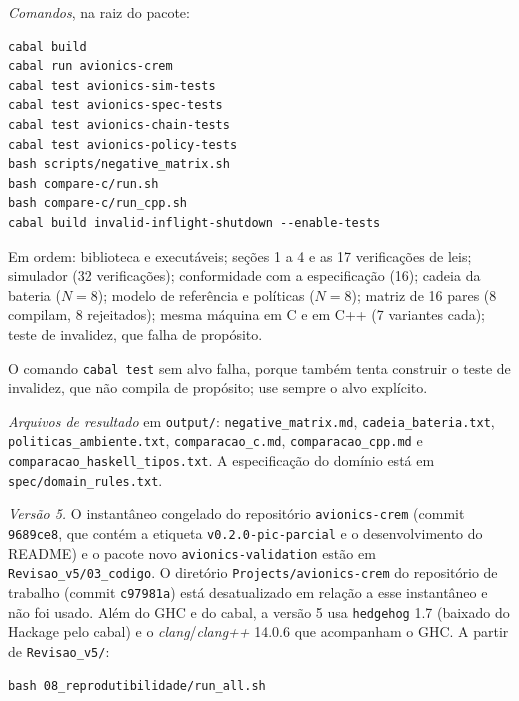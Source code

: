 \documentclass[12pt,a4paper]{article}
\begin{document}
\textit{Comandos}, na raiz do pacote:

{\footnotesize
\begin{verbatim}
cabal build
cabal run avionics-crem
cabal test avionics-sim-tests
cabal test avionics-spec-tests
cabal test avionics-chain-tests
cabal test avionics-policy-tests
bash scripts/negative_matrix.sh
bash compare-c/run.sh
bash compare-c/run_cpp.sh
cabal build invalid-inflight-shutdown --enable-tests
\end{verbatim}
}

Em ordem: biblioteca e executáveis; seções 1 a 4 e as 17 verificações de leis; simulador (32 verificações); conformidade com a especificação (16); cadeia da bateria ($N = 8$); modelo de referência e políticas ($N = 8$); matriz de 16 pares (8 compilam, 8 rejeitados); mesma máquina em C e em C++ (7 variantes cada); teste de invalidez, que falha de propósito.

O comando \texttt{cabal test} sem alvo falha, porque também tenta construir o teste de invalidez, que não compila de propósito; use sempre o alvo explícito.

\textit{Arquivos de resultado} em \texttt{output/}: \texttt{negative\_matrix.md}, \texttt{cadeia\_bateria.txt}, \texttt{politicas\_ambiente.txt}, \texttt{comparacao\_c.md}, \texttt{comparacao\_cpp.md} e \texttt{comparacao\_haskell\_tipos.txt}. A especificação do domínio está em \texttt{spec/domain\_rules.txt}.

\textit{Versão 5.} O instantâneo congelado do repositório \texttt{avionics-crem} (commit \texttt{9689ce8}, que contém a etiqueta \texttt{v0.2.0-pic-parcial} e o desenvolvimento do README) e o pacote novo \texttt{avionics-validation} estão em \texttt{Revisao\_v5/03\_codigo}. O diretório \texttt{Projects/avionics-crem} do repositório de trabalho (commit \texttt{c97981a}) está desatualizado em relação a esse instantâneo e não foi usado. Além do GHC e do cabal, a versão 5 usa \texttt{hedgehog} 1.7 (baixado do Hackage pelo cabal) e o \textit{clang}/\textit{clang++} 14.0.6 que acompanham o GHC. A partir de \texttt{Revisao\_v5/}:

{\footnotesize
\begin{verbatim}
bash 08_reprodutibilidade/run_all.sh
\end{verbatim}
}
\end{document}
